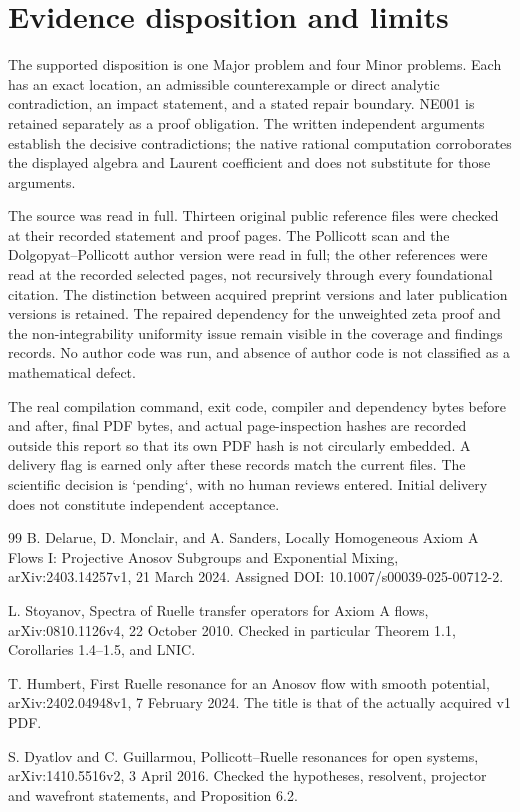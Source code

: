 \documentclass[10pt]{article}
\begin{document}
\section*{Evidence disposition and limits}
The supported disposition is one Major problem and four Minor problems. Each has an exact location, an admissible counterexample or direct analytic contradiction, an impact statement, and a stated repair boundary. NE001 is retained separately as a proof obligation. The written independent arguments establish the decisive contradictions; the native rational computation corroborates the displayed algebra and Laurent coefficient and does not substitute for those arguments.\par
The source was read in full. Thirteen original public reference files were checked at their recorded statement and proof pages. The Pollicott scan and the Dolgopyat–Pollicott author version were read in full; the other references were read at the recorded selected pages, not recursively through every foundational citation. The distinction between acquired preprint versions and later publication versions is retained. The repaired dependency for the unweighted zeta proof and the non-integrability uniformity issue remain visible in the coverage and findings records. No author code was run, and absence of author code is not classified as a mathematical defect.\par
The real compilation command, exit code, compiler and dependency bytes before and after, final PDF bytes, and actual page-inspection hashes are recorded outside this report so that its own PDF hash is not circularly embedded. A delivery flag is earned only after these records match the current files. The scientific decision is `pending`, with no human reviews entered. Initial delivery does not constitute independent acceptance.\par
99 B. Delarue, D. Monclair, and A. Sanders, Locally Homogeneous Axiom A Flows I: Projective Anosov Subgroups and Exponential Mixing, arXiv:2403.14257v1, 21 March 2024. Assigned DOI: 10.1007/s00039-025-00712-2.\par
L. Stoyanov, Spectra of Ruelle transfer operators for Axiom A flows, arXiv:0810.1126v4, 22 October 2010. Checked in particular Theorem 1.1, Corollaries 1.4–1.5, and LNIC.\par
T. Humbert, First Ruelle resonance for an Anosov flow with smooth potential, arXiv:2402.04948v1, 7 February 2024. The title is that of the actually acquired v1 PDF.\par
S. Dyatlov and C. Guillarmou, Pollicott–Ruelle resonances for open systems, arXiv:1410.5516v2, 3 April 2016. Checked the hypotheses, resolvent, projector and wavefront statements, and Proposition 6.2.\par
\end{document}

